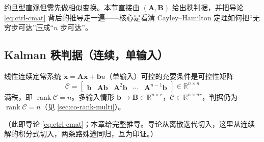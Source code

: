 约旦型直观但需先做相似变换。本节直接由 $(\mathbf{A},\mathbf{B})$ 给出秩判据，并把导论 \cref{eq:ctrl-cmat} 背后的推导走一遍——核心是看清 Cayley--Hamilton 定理如何把“无穷步可达”压成“$n$ 步可达”。

\subsection{Kalman 秩判据（连续，单输入）}
\label{sec:co-kalman-cont}

\begin{theorem}\label{thm:co-rank}
线性连续定常系统 $\dot{\mathbf{x}}=\mathbf{A}\mathbf{x}+\mathbf{b}u$（单输入）可控的充要条件是可控性矩阵
\begin{equation}
  \mathcal{C}=\begin{bmatrix}\mathbf{b} & \mathbf{A}\mathbf{b} & \mathbf{A}^2\mathbf{b} & \cdots & \mathbf{A}^{n-1}\mathbf{b}\end{bmatrix}\in\mathbb{R}^{n\times n}
  \label{eq:co-cmat}
\end{equation}
满秩，即 $\operatorname{rank}\mathcal{C}=n$\cite{liubao2006modern}。多输入情形 $\mathbf{b}\to\mathbf{B}\in\mathbb{R}^{n\times r}$，$\mathcal{C}\in\mathbb{R}^{n\times nr}$，判据仍为 $\operatorname{rank}\mathcal{C}=n$（见 \cref{sec:co-rank-multi}）。
\end{theorem}

\noindent{}（此即导论 \cref{eq:ctrl-cmat}；本章给完整推导。导论从离散迭代切入，这里从连续解的积分式切入，两条路殊途同归，互为印证。）

